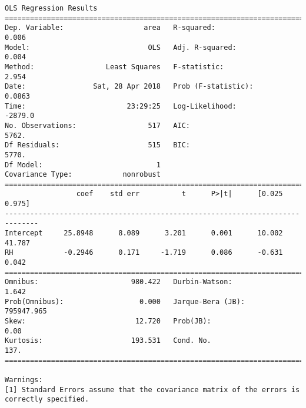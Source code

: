\documentclass[11pt]{article}
\begin{document}
\begin{Verbatim}[commandchars=\\\{\}]
                            OLS Regression Results                            
==============================================================================
Dep. Variable:                   area   R-squared:                       0.006
Model:                            OLS   Adj. R-squared:                  0.004
Method:                 Least Squares   F-statistic:                     2.954
Date:                Sat, 28 Apr 2018   Prob (F-statistic):             0.0863
Time:                        23:29:25   Log-Likelihood:                -2879.0
No. Observations:                 517   AIC:                             5762.
Df Residuals:                     515   BIC:                             5770.
Df Model:                           1                                         
Covariance Type:            nonrobust                                         
==============================================================================
                 coef    std err          t      P>|t|      [0.025      0.975]
------------------------------------------------------------------------------
Intercept     25.8948      8.089      3.201      0.001      10.002      41.787
RH            -0.2946      0.171     -1.719      0.086      -0.631       0.042
==============================================================================
Omnibus:                      980.422   Durbin-Watson:                   1.642
Prob(Omnibus):                  0.000   Jarque-Bera (JB):           795947.965
Skew:                          12.720   Prob(JB):                         0.00
Kurtosis:                     193.531   Cond. No.                         137.
==============================================================================

Warnings:
[1] Standard Errors assume that the covariance matrix of the errors is correctly specified.



\end{Verbatim}
\end{document}
